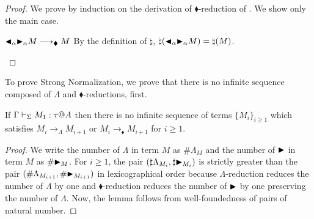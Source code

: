 \begin{proof}
    We prove by induction on the derivation of $\blacklozenge$-reduction of
    \LMD.  We show only the main case.
    \begin{rneqncase}{ \( {\mathop{\blacktriangleleft}}_\alpha {\mathop{\blacktriangleright}}_\alpha M \longrightarrow_\blacklozenge M \) }{}
        By the definition of $\natural$, \(\natural({\mathop{\blacktriangleleft}}_\alpha {\mathop{\blacktriangleright}}_\alpha M) =
        \natural(M)\).
    \end{rneqncase}
\end{proof}

To prove Strong Normalization, we prove that there is no infinite sequence composed of \( \Lambda \) and \( \blacklozenge \)-reductions, first.

\begin{lemma}
    \label{lemma:StrongNormalizationWithoutBetaReduction}
    If \( \G\V M_1:\tau@A \) then there is no infinite sequence of terms $\{M_i\}_{i\ge1}$ which satisfies $M_i \longrightarrow_\Lambda M_{i+1}$ or $M_i \longrightarrow_\blacklozenge M_{i+1}$ for $i\ge 1$.
\end{lemma}

\begin{proof}
    We write the number of \( \Lambda \) in term \( M \) as \( \#\Lambda_M \) and the number of \( {\mathop{\blacktriangleright}} \) in term \( M \) as \( \#{\mathop{\blacktriangleright}}_M \). For \( i \ge 1 \), the pair \( ( \sharp \Lambda_{M_i}, \sharp {\mathop{\blacktriangleright}}_{M_i} ) \) is strictly greater than the pair \( (\#\Lambda_{M_{i+1}}, \#{\mathop{\blacktriangleright}}_{M_{i+1}}) \) in lexicographical order because \( \Lambda \)-reduction reduces the number of \( \Lambda \) by one and \( \blacklozenge \)-reduction reduces the number of \( {\mathop{\blacktriangleright}} \) by one preserving the number of \( \Lambda \). Now, the lemma follows from well-foundedness of pairs of natural number.

\end{proof}

